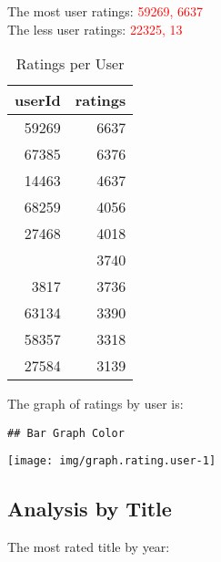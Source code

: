 \documentclass[]{article}
\begin{document}
The most user ratings: \textcolor{red}{59269, 6637}\\
The less user ratings: \textcolor{red}{22325, 13}

\begin{table}[!h]

\caption{\label{tab:table.rating.user}Ratings per User}
\centering
\begin{tabular}{rr}
\toprule
userId & ratings\\
\midrule
\rowcolor{gray!6}  59269 & 6637\\
67385 & 6376\\
\rowcolor{gray!6}  14463 & 4637\\
68259 & 4056\\
\rowcolor{gray!6}  27468 & 4018\\
\addlinespace
19635 & 3740\\
\rowcolor{gray!6}  3817 & 3736\\
63134 & 3390\\
\rowcolor{gray!6}  58357 & 3318\\
27584 & 3139\\
\bottomrule
\end{tabular}
\end{table}

The graph of ratings by user is:

\begin{verbatim}
## Bar Graph Color
\end{verbatim}

\begin{center}\texttt{[image: img/graph.rating.user-1]} \end{center}

\hypertarget{analysis-by-title}{%
\subsection{Analysis by Title}\label{analysis-by-title}}

The most rated title by year:
\end{document}
